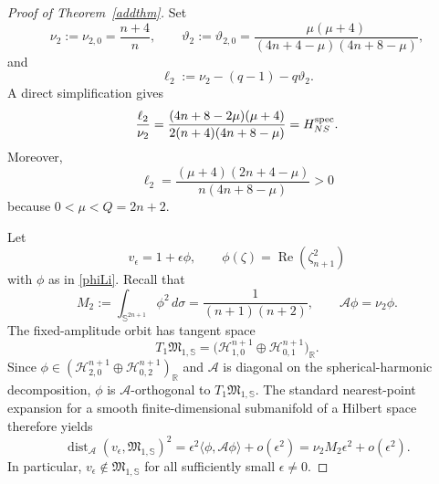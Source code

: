 \documentclass[11pt]{article}
\begin{document}
\begin{proof}
[Proof of Theorem~\ref{addthm}]
Set
\[
 \nu_2:=\nu_{2,0}=\frac{n+4}{n},
 \qquad
 \vartheta_2:=\vartheta_{2,0}
 =\frac{\mu(\mu+4)}{(4n+4-\mu)(4n+8-\mu)},
\]
and
\begin{equation}\label{CP-ell2}
 \ell_2:=\nu_2-(q-1)-q\vartheta_2.
\end{equation}
A direct simplification gives
\begin{equation}\label{CP-kappa}
 \frac{\ell_2}{\nu_2}
 =\frac{(4n+8-2\mu)(\mu+4)}{2(n+4)(4n+8-\mu)}
 =H_{NS}^{\rm spec}.
\end{equation}
Moreover,
\[
 \ell_2=\frac{(\mu+4)(2n+4-\mu)}{n(4n+8-\mu)}>0
\]
because $0<\mu<Q=2n+2$.

Let
\[
 v_\epsilon=1+\epsilon\phi,
 \qquad
 \phi(\zeta)=\operatorname{Re}(\zeta_{n+1}^2)
\]
with $\phi$ as in \eqref{phiLi}. Recall that
\begin{equation}\label{CP-M2}
 M_2:=\int_{\mathbb S^{2n+1}}\phi^2\,d\sigma
 =\frac{1}{(n+1)(n+2)},
 \qquad
 \mathscr A\phi=\nu_2\phi.
\end{equation}
The fixed-amplitude orbit has tangent space
\[
 T_1\mathfrak M_{1,\mathbb S}
 =\big(\mathcal H_{1,0}^{n+1}\oplus\mathcal H_{0,1}^{n+1}\big)_{\mathbb R}.
\]
Since $\phi\in(\mathcal H_{2,0}^{n+1}\oplus\mathcal H_{0,2}^{n+1})_{\mathbb R}$ and $\mathscr A$ is diagonal on the spherical-harmonic decomposition, $\phi$ is $\mathscr A$-orthogonal to $T_1\mathfrak M_{1,\mathbb S}$. The standard nearest-point expansion for a smooth finite-dimensional submanifold of a Hilbert space therefore yields
\begin{equation}\label{CP-distance}
 \operatorname{dist}_{\mathscr A}(v_\epsilon,\mathfrak M_{1,\mathbb S})^2
 =\epsilon^2\langle\phi,\mathscr A\phi\rangle+o(\epsilon^2)
 =\nu_2M_2\epsilon^2+o(\epsilon^2).
\end{equation}
In particular, $v_\epsilon\notin\mathfrak M_{1,\mathbb S}$ for all sufficiently small $\epsilon\ne0$.


\end{proof}
\end{document}
